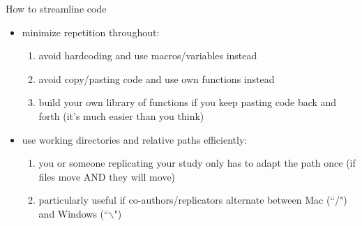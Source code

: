 \documentclass[10pt, aspectratio=169]{beamer}
\begin{document}
\begin{frame}[t]{How to streamline code}
	\vspace{1mm}
	\begin{itemize}
		\item \alert{minimize repetition throughout:} 
		\begin{enumerate}
		\item avoid hardcoding and use macros/variables instead\vspace{1mm}
		\item avoid copy/pasting code and use own functions instead\vspace{1mm}
		\item build your own library of functions if you keep pasting code back and forth (it's much easier than you think)\vspace{3mm}
		\end{enumerate} 
		\item \alert{use working directories and relative paths efficiently:} 
		\begin{enumerate}
		\item you or someone replicating your study only has to adapt the path once (if files move AND they will move)\vspace{1mm}
		\item particularly useful if co-authors/replicators alternate between Mac (``/") and Windows (``$\backslash$")
		\end{enumerate} 
	\end{itemize}
\end{frame}
\end{document}
